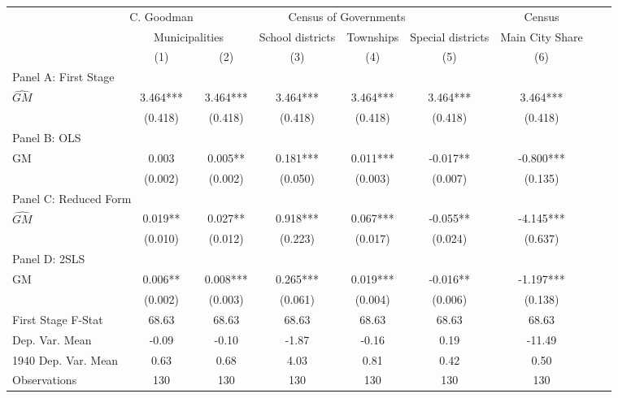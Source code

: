  \begin{tabular}{l*{8}{c}} \toprule
&\multicolumn{1}{c}{C. Goodman}&\multicolumn{4}{c}{Census of Governments}&\multicolumn{1}{c}{Census}\\\cmidrule(lr){2-2}\cmidrule(lr){3-6}\cmidrule(lr){7-7}
&\multicolumn{2}{c}{Municipalities}&\multicolumn{1}{c}{School districts}&\multicolumn{1}{c}{Townships}&\multicolumn{1}{c}{Special districts}&\multicolumn{1}{c}{Main City Share}\\\cmidrule(lr){2-3}\cmidrule(lr){4-6}\cmidrule(lr){7-7}
&\multicolumn{1}{c}{(1)}&\multicolumn{1}{c}{(2)}&\multicolumn{1}{c}{(3)}&\multicolumn{1}{c}{(4)}&\multicolumn{1}{c}{(5)}&\multicolumn{1}{c}{(6)}\\
\cmidrule(lr){1-7}
\multicolumn{6}{l}{Panel A: First Stage}\\
\cmidrule(lr){1-7}
$\widehat{GM}$  &    3.464***&    3.464***&    3.464***&    3.464***&    3.464***&    3.464***\\
                &  (0.418)   &  (0.418)   &  (0.418)   &  (0.418)   &  (0.418)   &  (0.418)   \\
\cmidrule(lr){1-7}
\multicolumn{6}{l}{Panel B: OLS}\\
\cmidrule(lr){1-7}
GM              &    0.003   &    0.005** &    0.181***&    0.011***&   -0.017** &   -0.800***\\
                &  (0.002)   &  (0.002)   &  (0.050)   &  (0.003)   &  (0.007)   &  (0.135)   \\
\cmidrule(lr){1-7}
\multicolumn{6}{l}{Panel C: Reduced Form}\\
\cmidrule(lr){1-7}
$\widehat{GM}$  &    0.019** &    0.027** &    0.918***&    0.067***&   -0.055** &   -4.145***\\
                &  (0.010)   &  (0.012)   &  (0.223)   &  (0.017)   &  (0.024)   &  (0.637)   \\
\cmidrule(lr){1-7}
\multicolumn{6}{l}{Panel D: 2SLS}\\
\cmidrule(lr){1-7}
GM              &    0.006** &    0.008***&    0.265***&    0.019***&   -0.016** &   -1.197***\\
                &  (0.002)   &  (0.003)   &  (0.061)   &  (0.004)   &  (0.006)   &  (0.138)   \\
\midrule
First Stage F-Stat&    68.63   &    68.63   &    68.63   &    68.63   &    68.63   &    68.63   \\
Dep. Var. Mean  &    -0.09   &    -0.10   &    -1.87   &    -0.16   &     0.19   &   -11.49   \\
1940 Dep. Var. Mean&     0.63   &     0.68   &     4.03   &     0.81   &     0.42   &     0.50   \\
Observations    &      130   &      130   &      130   &      130   &      130   &      130   \\
       \bottomrule \end{tabular}
